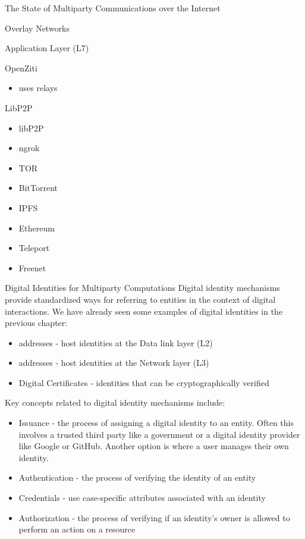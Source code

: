 \begin{frame}[fragile]{The State of Multiparty Communications over the
Internet}
\begin{block}{Overlay Networks}
\begin{block}{Application Layer (L7)}
\begin{block}{OpenZiti}

\begin{itemize}
\tightlist
\item
  uses relays
\end{itemize}
\end{block}

\begin{block}{LibP2P}
\protect\hypertarget{libp2p}{}
\begin{itemize}
\tightlist
\item
  libP2P
\item
  ngrok
\item
  TOR
\item
  BitTorrent
\item
  IPFS
\item
  Ethereum
\item
  Teleport
\item
  Freenet
\end{itemize}
\end{block}
\end{block}
\end{block}

\begin{block}{Digital Identities for Multiparty Computations}
\protect\hypertarget{digital-identities-for-multiparty-computations}{}
Digital identity mechanisms provide standardized ways for referring to
entities in the context of digital interactions. We have already seen
some examples of digital identities in the previous chapter:

\begin{itemize}
\tightlist
\item
   addresses - host identities at the Data link layer (L2)
\item
   addresses - host identities at the Network layer (L3)
\item
  Digital Certificates - identities that can be cryptographically
  verified
\end{itemize}

Key concepts related to digital identity mechanisms include:

\begin{itemize}
\tightlist
\item
  Issuance - the process of assigning a digital identity to an entity.
  Often this involves a trusted third party like a government or a
  digital identity provider like Google or GitHub. Another option is
   where a user manages their own identity.
\item
  Authentication - the process of verifying the identity of an entity
\item
  Credentials - use case-specific attributes associated with an identity
\item
  Authorization - the process of verifying if an identity's owner is
  allowed to perform an action on a resource
\end{itemize}


\end{block}
\end{frame}
